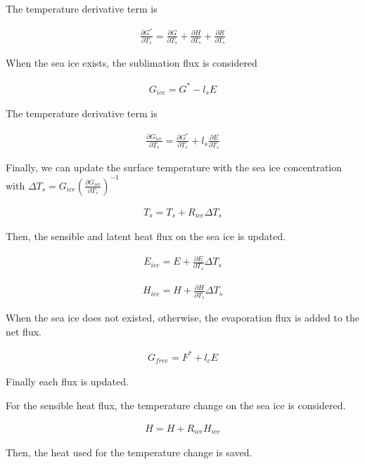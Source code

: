 The temperature derivative term is

\begin{eqnarray}
    \frac{\partial G^*}{\partial T_s} = \frac{\partial G}{\partial T_s}+\frac{\partial H}{\partial T_s}+\frac{\partial R}{\partial T_s}
\end{eqnarray}

When the sea ice exists, the sublimation flux is considered

\begin{eqnarray}
    G_{ice} = G^* - l_s E
\end{eqnarray}

The temperature derivative term is

\begin{eqnarray}
    \frac{\partial G_{ice}}{\partial T_s}=\frac{\partial G^*}{\partial T_s} + l_s\frac{\partial E}{\partial T_s}
\end{eqnarray}

Finally, we can update the surface temperature with the sea ice
concentration with
\(\Delta T_s=G_{ice} ( \frac{\partial G_{ice}}{\partial T_s})^{-1}\)

\begin{eqnarray}
    T_s = T_s +R_{ice} \Delta T_s
\end{eqnarray}

Then, the sensible and latent heat flux on the sea ice is updated.

\begin{eqnarray}
    E_{ice} = E + \frac{\partial E}{\partial T_s}\Delta T_s
\end{eqnarray}

\begin{eqnarray}
    H_{ice} = H + \frac{\partial H}{\partial T_s}\Delta T_s
\end{eqnarray}

When the sea ice does not existed, otherwise, the evaporation flux is
added to the net flux.

\begin{eqnarray}
    G_{free}=F^* + l_cE
\end{eqnarray}

Finally each flux is updated.

For the sensible heat flux, the temperature change on the sea ice is
considered.

\begin{eqnarray}
    H=H+ R_{ice}  H_{ice}
\end{eqnarray}

Then, the heat used for the temperature change is saved.

